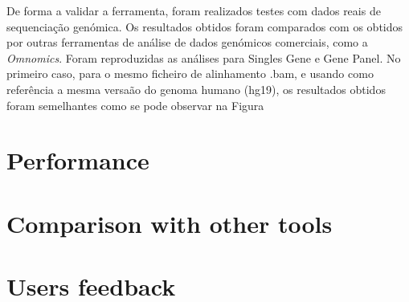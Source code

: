 De forma a validar a ferramenta, foram realizados testes com dados reais de sequenciação genómica. Os resultados obtidos foram comparados com os obtidos por outras ferramentas de análise de dados genómicos comerciais, como a \textit{Omnomics}. Foram reproduzidas as análises para Singles Gene e Gene Panel. 
No primeiro caso, para o mesmo ficheiro de alinhamento .bam, e usando como referência a mesma versaão do genoma humano (hg19), os resultados obtidos foram semelhantes como se pode observar na Figura

\section{Performance}


\section{Comparison with other tools}


\section{Users feedback}






